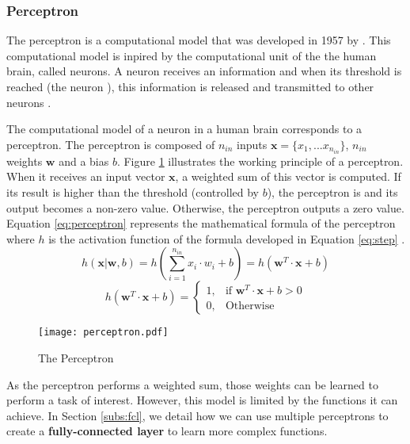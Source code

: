 \subsubsection{Perceptron} \label{subs:perceptron}
The perceptron is a computational model that was developed in 1957 by \textcite{rosenblatt_perceptron_1958}. This computational model is inpired by the computational unit of the the human brain, called neurons. A neuron receives an information and when its threshold is reached (the neuron ), this information is released and transmitted to other neurons \cite{rosenblatt_perceptron_1958, matteucci_artificial_2019}.

The computational model of a neuron in a human brain corresponds to a perceptron. The perceptron is composed of $n_{in}$ inputs $\boldsymbol{x} = \{ x_1, ... x_{n_{in}} \}$, $n_{in}$ weights $\boldsymbol{w}$ and a bias $b$. Figure \ref{fig:perceptron} illustrates the working principle of a perceptron. When it receives an input vector $\boldsymbol{x}$, a weighted sum of this vector is computed. If its result is higher than the threshold (controlled by $b$), the perceptron is  and its output becomes a non-zero value. Otherwise, the perceptron outputs a zero value.
Equation \ref{eq:perceptron} represents the mathematical formula of the perceptron where $h$ is the activation function of the formula developed in Equation \ref{eq:step} \cite{matteucci_artificial_2019}.
%
\begin{equation}
    h ( \boldsymbol{x} | \boldsymbol{w}, b) = h \left( \sum^{n_{in}}_{i=1} x_i \cdot w_i + b \right) = h \left( \boldsymbol{w}^{T} \cdot \boldsymbol{x} + b \right)
    \label{eq:perceptron}
\end{equation}
%
\begin{equation}
    h ( \boldsymbol{w}^{T} \cdot \boldsymbol{x} + b) = \begin{cases} 1, & \mbox{if } \boldsymbol{w}^{T} \cdot \boldsymbol{x} + b > 0 \\ 0, & \mbox{Otherwise} \end{cases}
    \label{eq:step}
\end{equation}
%
\begin{figure}[H]
    \centering
    \texttt{[image: perceptron.pdf]}
    \caption{The Perceptron}
    \label{fig:perceptron}
\end{figure}

As the perceptron performs a weighted sum, those weights can be learned to perform a task of interest. However, this model is limited by the functions it can achieve. In Section \ref{subs:fcl}, we detail how we can use multiple perceptrons to create a \textbf{fully-connected layer} to learn more complex functions.
